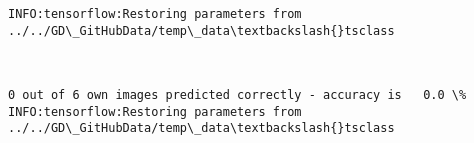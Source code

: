 \documentclass[11pt]{article}
\begin{document}
    \begin{Verbatim}[commandchars=\\\{\}]
INFO:tensorflow:Restoring parameters from ../../GD\_GitHubData/temp\_data\textbackslash{}tsclass

    \end{Verbatim}

    \begin{center}
    \end{center}
    { \hspace*{\fill} \\}
    
    \begin{Verbatim}[commandchars=\\\{\}]
0 out of 6 own images predicted correctly - accuracy is   0.0 \%
INFO:tensorflow:Restoring parameters from ../../GD\_GitHubData/temp\_data\textbackslash{}tsclass

    \end{Verbatim}

    \begin{center}
    \end{center}
    { \hspace*{\fill} \\}
    
    \begin{center}
    \end{center}
    { \hspace*{\fill} \\}
    
    \begin{center}
    \end{center}
    { \hspace*{\fill} \\}
    
    \begin{center}
    \end{center}
    { \hspace*{\fill} \\}
    
    \begin{center}
    \end{center}
    { \hspace*{\fill} \\}
    
\end{document}
